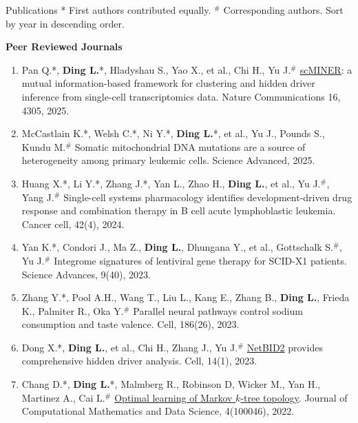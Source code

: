 \documentclass{resume} %
\begin{document}
\begin{rSection}{Publications}
* First authors contributed equally.  $^{\#}$ Corresponding authors. Sort by year in descending order.

\textbf{Peer Reviewed Journals}
\begin{enumerate}
\item Pan Q.*, \textbf{Ding L.}*, Hladyshau S., Yao X., et al., Chi H., Yu J.$^{\#}$ \href{https://www.nature.com/articles/s41467-025-59620-6}{scMINER}: a mutual information-based framework for clustering and hidden driver inference from single-cell transcriptomics data. Nature Communications 16, 4305, 2025.\label{scminer}

\item McCastlain K.*, Welsh C.*, Ni Y.*, \textbf{Ding L.}*, et al., Yu J., Pounds S., Kundu M.$^{\#}$ Somatic mitochondrial DNA mutations are a source of heterogeneity among primary leukemic cells. Science Advanced, 2025.\label{mtDNA}

\item Huang X.*, Li Y.*, Zhang J.*, Yan L., Zhao H., \textbf{Ding L.}, et al., Yu J.$^{\#}$, Yang J.$^{\#}$ Single-cell systems pharmacology identifies development-driven drug response and combination therapy in B cell acute lymphoblastic leukemia. Cancer cell, 42(4), 2024.\label{bcell}

\item Yan K.*, Condori J., Ma Z., \textbf{Ding L.}, Dhungana Y., et al., Gottschalk S.$^{\#}$, Yu J.$^{\#}$ Integrome signatures of lentiviral gene therapy for SCID-X1 patients. Science Advances, 9(40), 2023.\label{lentiviral}

\item Zhang Y.*, Pool A.H., Wang T., Liu L., Kang E., Zhang B., \textbf{Ding L.}, Frieda K., Palmiter R., Oka Y.$^{\#}$ Parallel neural pathways control sodium consumption and taste valence. Cell, 186(26), 2023.\label{sodium}

\item Dong X.*, \textbf{Ding L.}, et al., Chi H., Zhang J., Yu J.$^{\#}$ \href{https://www.nature.com/articles/s41467-023-38335-6}{NetBID2} provides comprehensive hidden driver analysis. Cell, 14(1), 2023.\label{netbid2}

\item Chang D.*, \textbf{Ding L.}*, Malmberg R., Robinson D, Wicker M., Yan H., Martinez A., Cai L.$^{\#}$ \href{https://www.sciencedirect.com/science/article/pii/S277241582200013X}{Optimal learning of Markov $k$-tree topology}. Journal of Computational Mathematics and Data Science, 4(100046), 2022.\label{optimalktree}


\end{enumerate}
\end{rSection}
\end{document}
